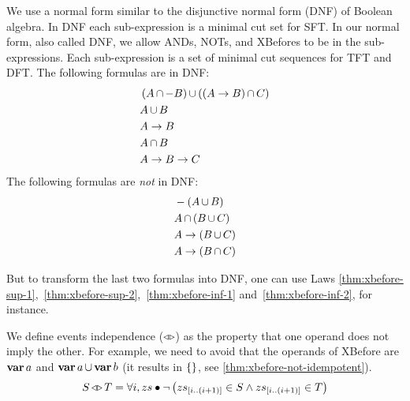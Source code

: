 \documentclass[en,twoside,onehalfspacing,phd]{risethesis}
\newcommand{\slice}[3]{\ensuremath #1_{\left[#2..#3\right]}}
\def\varop{\ensuremath\operatorname{\mathbf{var}}}
\newcommand{\var}[1]{\ensuremath\varop #1}
\def\xbeforeop{\ensuremath\rightarrow}
\newcommand{\xbefore}[2]{\ensuremath #1 \xbeforeop #2 }
\def\independenteventsop{\ensuremath\operatorname{\triangleleft\triangleright}}
\newcommand{\independentevents}[2]{\ensuremath #1 \independenteventsop #2}
\def\False{\ensuremath\operatorname{\left\{\right\}}}
\newcommand{\parsin}[1]{\ensuremath\left( #1 \right)}
\def\union{\ensuremath\operatorname{\cup}}
\def\inter{\ensuremath\operatorname{\cap}}
\begin{document}
We use a normal form similar to the disjunctive normal form (DNF) of Boolean algebra.
In DNF each sub-expression is a minimal cut set for \ac{SFT}.
In our normal form, also called DNF, we allow ANDs, NOTs, and XBefores to be in the sub-expressions.
Each sub-expression is a set of minimal cut sequences for \ac{TFT} and \ac{DFT}.
The following formulas are in DNF:
%
\begin{align*}
&\parsin{A \inter -B} \union \parsin{\parsin{\xbefore{A}{B}} \inter C}\\
&A \union B\\
&\xbefore{A}{B}\\
&A \inter B\\
&\xbefore{\xbefore{A}{B}}{C}
\end{align*}
%
The following formulas are \emph{not} in DNF:
%
\begin{align*}
&-\parsin{A \union B}\\
&A \inter \parsin{B \union C}\\
&\xbefore{A}{\parsin{B \union C}}\\
&\xbefore{A}{\parsin{B \inter C}}
\end{align*}

But to transform the last two formulas into DNF, one can use Laws \eqref{thm:xbefore-sup-1},~\eqref{thm:xbefore-sup-2},~\eqref{thm:xbefore-inf-1} and~\eqref{thm:xbefore-inf-2}, for instance.

We define events independence ($\independenteventsop$) as the property that one operand does not imply the other.
For example, we need to avoid that the operands of XBefore are $\var{a}$ and $\var{a} \union \var{b}$ (it results in $\False$, see \eqref{thm:xbefore-not-idempotent}).
%
\begin{equation}
\independentevents{S}{T} = \forall i, zs \bullet
  \lnot \left(
    \slice{zs}{i}{\left(i+1\right)} \in S \land
    \slice{zs}{i}{\left(i+1\right)} \in T
  \right)
\end{equation}
\end{document}
